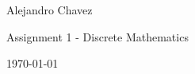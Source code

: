 \documentclass[10pt,a4paper]{article}
\begin{document}
\hfill Alejandro Chavez

\hfill Assignment 1 - Discrete Mathematics

\hfill \today\\

\begin{itemize}
\end{itemize}
\end{document}
